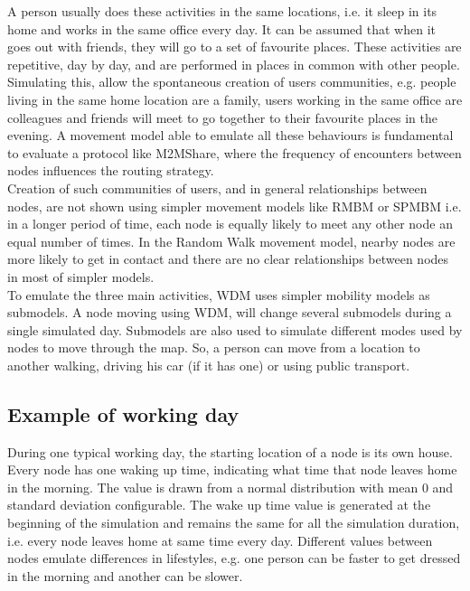 A person usually does these activities in the same locations, i.e. it sleep in its home and works in the same office every day. It can be assumed that when it goes out with friends, they will go to a set of favourite places. These activities are repetitive, day by day, and are performed in places in common with other people. Simulating this, allow the spontaneous creation of users communities, e.g. people living in the same home location are a family, users working in the same office are colleagues and friends will meet to go together to their favourite places in the evening. A movement model able to emulate all these behaviours is fundamental to evaluate a protocol like M2MShare, where the frequency of encounters between nodes influences the routing strategy.\\

Creation of such communities of users, and in general relationships between nodes, are not shown using simpler movement models like RMBM or SPMBM i.e. in a longer period of time, each node is equally likely to meet any other node an equal number of times. In the Random Walk movement model, nearby nodes are more likely to get in contact and there are no clear relationships between nodes in most of simpler models.
\\

To emulate the three main activities, WDM uses simpler mobility models as submodels. A node moving using WDM, will change several submodels during a single simulated day. Submodels are also used to simulate different modes used by nodes to move through the map. So, a person can move from a location to another walking, driving his car (if it has one) or using public transport.
\\


\subsection{Example of working day}
During one typical working day, the starting location of a node is its own house. Every node has one waking up time, indicating what time that node leaves home in the morning. The value is drawn from a normal distribution with mean 0 and standard deviation configurable. The wake up time value is generated at the beginning of the simulation and remains the same for all the simulation duration, i.e. every node leaves home at same time every day. Different values between nodes emulate differences in lifestyles, e.g. one person can be faster to get dressed in the morning and another can be slower.
\\ 

